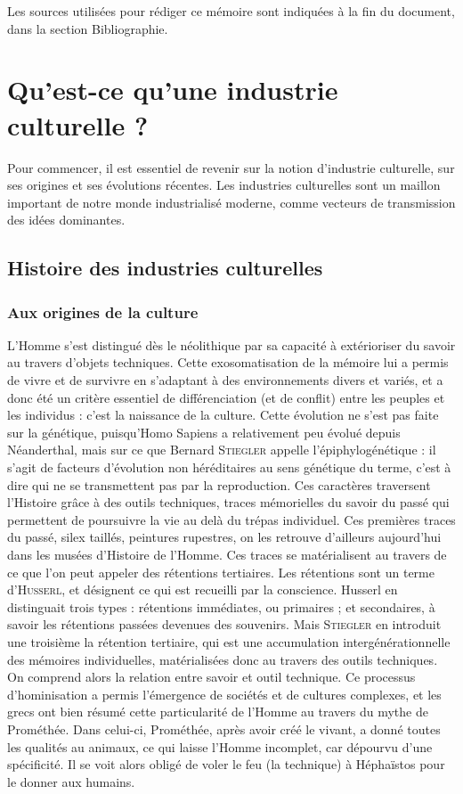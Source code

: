 \documentclass[a4paper,12pt]{report}
\begin{document}
Les sources utilisées pour rédiger ce mémoire sont indiquées à la fin du document, dans la section Bibliographie.

\chapter{Qu'est-ce qu'une industrie culturelle ?}

Pour commencer, il est essentiel de revenir sur la notion d'industrie culturelle, sur ses origines et ses évolutions récentes. Les industries culturelles sont un maillon important de notre monde industrialisé moderne, comme vecteurs de transmission des idées dominantes.

\section{Histoire des industries culturelles}

\subsection{Aux origines de la culture}

L'Homme s'est distingué dès le néolithique par sa capacité à extérioriser du savoir au travers d'objets techniques. Cette exosomatisation de la mémoire lui a permis de vivre et de survivre en s'adaptant à des environnements divers et variés, et a donc été un critère essentiel de différenciation (et de conflit) entre les peuples et les individus : c'est la naissance de la culture. Cette évolution ne s'est pas faite sur la génétique, puisqu'Homo Sapiens a relativement peu évolué depuis Néanderthal, mais sur ce que Bernard \textsc{Stiegler} appelle l'épiphylogénétique : il s'agit de facteurs d'évolution non héréditaires au sens génétique du terme, c'est à dire qui ne se transmettent pas par la reproduction. Ces caractères traversent l'Histoire grâce à des outils techniques, traces mémorielles du savoir du passé qui permettent de poursuivre la vie au delà du trépas individuel. Ces premières traces du passé, silex taillés, peintures rupestres, on les retrouve d'ailleurs aujourd'hui dans les musées d'Histoire de l'Homme. Ces traces se matérialisent au travers de ce que l'on peut appeler des rétentions tertiaires. Les rétentions sont un terme d'\textsc{Husserl}, et désignent ce qui est recueilli par la conscience. Husserl en distinguait trois types : rétentions immédiates, ou primaires ; et secondaires, à savoir les rétentions passées devenues des souvenirs. Mais \textsc{Stiegler} en introduit une troisième la rétention tertiaire, qui est une accumulation intergénérationnelle des mémoires individuelles, matérialisées donc au travers des outils techniques. On comprend alors la relation entre savoir et outil technique. Ce processus d'hominisation a permis l'émergence de sociétés et de cultures complexes, et les grecs ont bien résumé cette particularité de l'Homme au travers du mythe de Prométhée. Dans celui-ci, Prométhée, après avoir créé le vivant, a donné toutes les qualités au animaux, ce qui laisse l'Homme incomplet, car dépourvu d'une spécificité. Il se voit alors obligé de voler le feu (la technique) à Héphaïstos pour le donner aux humains. 
\end{document}
